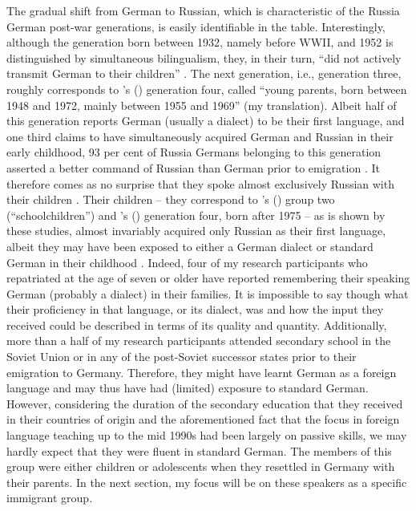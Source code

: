 The gradual shift from German to Russian, which is characteristic of the Russia German post-war generations, is easily identifiable in the table. Interestingly, although the generation born between 1932, namely before WWII, and 1952 is distinguished by simultaneous bilingualism, they, in their turn, ``did not actively transmit German to their children'' \citep[22]{riehlTA}. The next generation, i.e., generation three, roughly corresponds to \citeauthor{meng01}'s (\citeyear[][20]{meng01}) generation four, called ``young parents, born between 1948 and 1972, mainly between 1955 and 1969'' (my translation). Albeit half of this generation reports German (usually a dialect) to be their first language, and one third claims to have simultaneously acquired German and Russian in their early childhood, 93 per cent of Russia Germans belonging to this generation asserted a better command of Russian than German prior to emigration \citep[36]{meng01}. It therefore comes as no surprise that they spoke almost exclusively Russian with their children \citep[35]{meng01}. Their children -- they correspond to \citeauthor{meng01}'s (\citeyear{meng01}) group two (“schoolchildren”) and \citeauthor{riehlTA}'s (\citeyear{riehlTA}) generation four, born after 1975 -- as is shown by these studies, almost invariably acquired only Russian as their first language, albeit they may have been exposed to either a German dialect or standard German in their childhood \citep[cf.][35]{meng01}. Indeed, four of my research participants who repatriated at the age of seven or older have reported remembering their speaking German (probably a dialect) in their families. It is impossible to say though what their proficiency in that language, or its dialect, was and how the input they received could be described in terms of its quality and quantity. Additionally, more than a half of my research participants attended secondary school in the Soviet Union or in any of the post-Soviet successor states prior to their emigration to Germany. Therefore, they might have learnt German as a foreign language and may thus have had (limited) exposure to standard German. However, considering the duration of the secondary education that they received in their countries of origin and the aforementioned fact that the focus in foreign language teaching up to the mid 1990s had been largely on passive skills, we may hardly expect that they were fluent in standard German. The members of this group were either children or adolescents when they resettled in Germany with their parents. In the next section, my focus will be on these speakers as a specific immigrant group.

